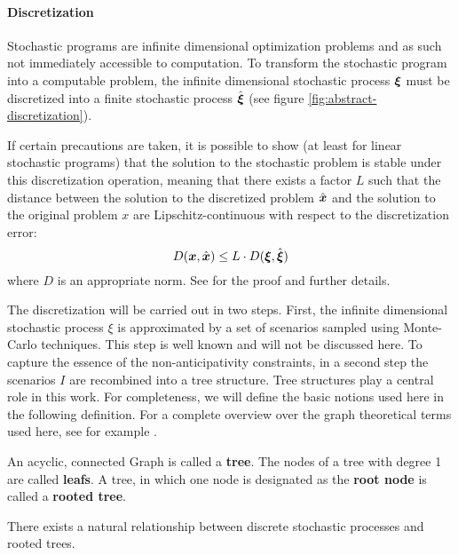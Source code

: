 \paragraph{Discretization}
%
Stochastic programs are infinite dimensional optimization problems and as such not immediately accessible to computation.
To transform the stochastic program into a computable problem, the infinite dimensional stochastic process $\boldsymbol \xi$ must be discretized into a finite stochastic process $\hat{\boldsymbol\xi}$ (see figure \ref{fig:abstract-discretization}).

If certain precautions are taken, it is possible to show (at least for linear stochastic programs) that the solution to the stochastic problem is stable under this discretization operation, meaning that there exists a factor $L$ such that the distance between the solution to the discretized problem $\hat{\boldsymbol x}$ and the solution to the original problem $x$ are Lipschitz-continuous with respect to the discretization error:
\begin{equation}
  D(\boldsymbol x , \hat{\boldsymbol x}) \leq L\cdot D(\boldsymbol\xi,\hat{\boldsymbol\xi})
\end{equation}
where $D$ is an appropriate norm. See  for the proof and further details.

The discretization will be carried out in two steps.
First, the infinite dimensional stochastic process $\xi$ is approximated by a set of scenarios sampled using Monte-Carlo techniques.
This step is well known and will not be discussed here.
To capture the essence of the non-anticipativity constraints, in a second step the scenarios $I$ are recombined into a tree structure.
Tree structures play a central role in this work.
For completeness, we will define the basic notions used here in the following definition.
For a complete overview over the graph theoretical terms used here, see for example .
\begin{definition}
  \label{def:tree}
  An acyclic, connected Graph is called a \textbf{tree}.
  The nodes of a tree with degree 1 are called \textbf{leafs}.
  A tree, in which one node is designated as the \textbf{root node} is called a \textbf{rooted tree}.
\end{definition}
There exists a natural relationship between discrete stochastic processes and rooted trees.
